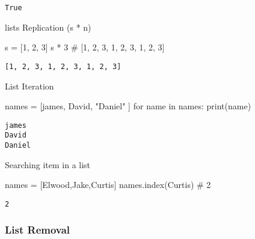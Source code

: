 \documentclass[
  letterpaper,
  DIV=11,
  numbers=noendperiod]{scrreprt}
\newenvironment{Shaded}{\begin{snugshade}}{\end{snugshade}}
\newcommand{\BuiltInTok}[1]{\textcolor[rgb]{0.00,0.46,0.62}{#1}}
\newcommand{\CommentTok}[1]{\textcolor[rgb]{0.37,0.37,0.37}{#1}}
\newcommand{\ControlFlowTok}[1]{\textcolor[rgb]{0.00,0.46,0.62}{#1}}
\newcommand{\DecValTok}[1]{\textcolor[rgb]{0.68,0.00,0.00}{#1}}
\newcommand{\KeywordTok}[1]{\textcolor[rgb]{0.00,0.46,0.62}{#1}}
\newcommand{\NormalTok}[1]{\textcolor[rgb]{0.00,0.46,0.62}{#1}}
\newcommand{\OperatorTok}[1]{\textcolor[rgb]{0.37,0.37,0.37}{#1}}
\newcommand{\StringTok}[1]{\textcolor[rgb]{0.13,0.47,0.30}{#1}}
\begin{document}
\begin{verbatim}
True
\end{verbatim}

lists Replication (s * n)

\begin{Shaded}
\begin{Highlighting}[]
\NormalTok{s }\OperatorTok{=}\NormalTok{ [}\DecValTok{1}\NormalTok{, }\DecValTok{2}\NormalTok{, }\DecValTok{3}\NormalTok{]}
\NormalTok{s }\OperatorTok{*} \DecValTok{3}   \CommentTok{\# [1, 2, 3, 1, 2, 3, 1, 2, 3]}
\end{Highlighting}
\end{Shaded}

\begin{verbatim}
[1, 2, 3, 1, 2, 3, 1, 2, 3]
\end{verbatim}

List Iteration

\begin{Shaded}
\begin{Highlighting}[]
\NormalTok{names }\OperatorTok{=}\NormalTok{ [}\StringTok{\textquotesingle{}james\textquotesingle{}}\NormalTok{, }\StringTok{\textquotesingle{}David\textquotesingle{}}\NormalTok{, }\StringTok{"Daniel"}\NormalTok{ ]}
\ControlFlowTok{for}\NormalTok{ name }\KeywordTok{in}\NormalTok{ names:}
    \BuiltInTok{print}\NormalTok{(name)}
\end{Highlighting}
\end{Shaded}

\begin{verbatim}
james
David
Daniel
\end{verbatim}

Searching item in a list

\begin{Shaded}
\begin{Highlighting}[]
\NormalTok{names }\OperatorTok{=}\NormalTok{ [}\StringTok{\textquotesingle{}Elwood\textquotesingle{}}\NormalTok{,}\StringTok{\textquotesingle{}Jake\textquotesingle{}}\NormalTok{,}\StringTok{\textquotesingle{}Curtis\textquotesingle{}}\NormalTok{]}
\NormalTok{names.index(}\StringTok{\textquotesingle{}Curtis\textquotesingle{}}\NormalTok{)   }\CommentTok{\# 2}
\end{Highlighting}
\end{Shaded}

\begin{verbatim}
2
\end{verbatim}

\hypertarget{list-removal}{%
\subsubsection{List Removal}\label{list-removal}}
\end{document}
